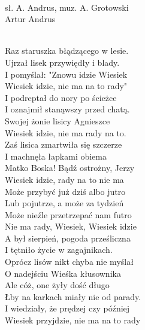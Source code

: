 \\
{sł. A. Andrus, muz. A. Grotowski}\\
{Artur Andrus}\\
\begin{text}\\
Raz staruszka błądzącego w lesie.\\
Ujrzał lisek przywiędły i blady.\\
I pomyślał: "Znowu idzie Wiesiek\\
Wiesiek idzie, nie ma na to rady"\\

I podreptał do nory po ścieżce\\
I oznajmił stanąwszy przed chatą.\\
Swojej żonie lisicy Agnieszce\\
Wiesiek idzie, nie ma rady na to.\\

Zaś lisica zmartwiła się szczerze\\
I machnęła łapkami obiema\\
Matko Boska! Bądź ostrożny, Jerzy\\
Wiesiek idzie, rady na to nie ma\\

Może przybyć już dziś albo jutro\\
Lub pojutrze, a może za tydzień\\
Może nieźle przetrzepać nam futro\\
Nie ma rady, Wiesiek, Wiesiek idzie\\

A był sierpień, pogoda prześliczna\\
I tętniło życie w zagajnikach.\\
Oprócz lisów nikt chyba nie myślał\\
O nadejściu Wieśka kłusownika\\

Ale cóż, one żyły dość długo\\
Łby na karkach miały nie od parady.\\
I wiedziały, że prędzej czy później\\
Wiesiek przyjdzie, nie ma na to rady\\
\end{text}\\